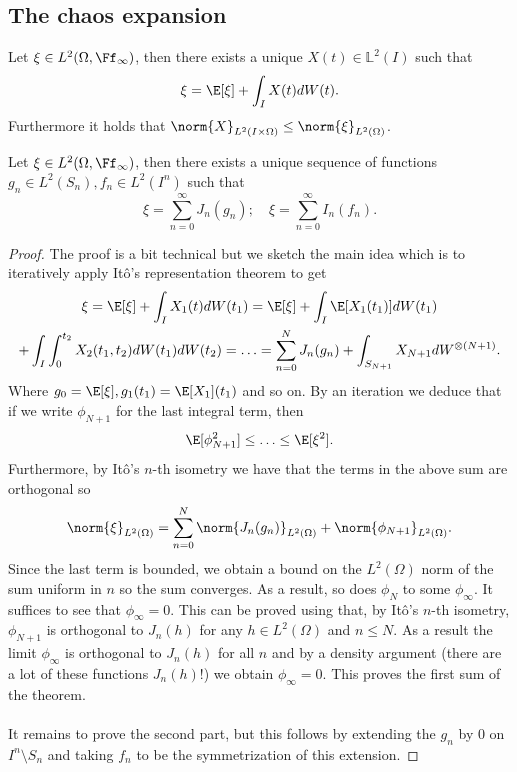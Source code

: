 \documentclass[
    a4paper,
    DIV=14,
    abstract=true,
    numbers=noenddot
]{scrartcl}
\begin{document}
\subsection{The chaos expansion}
\begin{lemma}
	Let $\xi\in L^2(\Omega,\Ff_\infty)$, then there exists a unique $X(t)\in \mathbb{L}^2(I)$ such that
	\begin{equation*}
		\xi=\E[\xi]+\int_{I} X(t)dW(t).
	\end{equation*}
	Furthermore it holds that $\norm{X}_{L^2(I\times\Omega)}\leq \norm{\xi}_{L^2(\Omega)}$.
\end{lemma}


\begin{theorem}\label{chaos thm}
	Let $\xi\in L^2(\Omega,\Ff_\infty)$, then there exists a unique sequence of functions $g_n \in L^2(S_n),f_n \in L^2(I^n)$ such that
	\begin{equation*}
		\xi=\sum_{n=0}^{\infty}  J_n(g_n);\quad \xi=\sum_{n=0}^{\infty} I_n(f_n).
	\end{equation*}
	\begin{proof}
		The proof is a bit technical but we sketch the main idea which is to iteratively apply Itô's representation theorem to get
		\begin{multline*}
			\xi=\E[\xi]+\int_I X_1(t)dW(t_1)=\E[\xi]+\int_{I} \E[X_1(t_1)] dW(t_1)\\+ \int_{I}\int_{0}^{t_2} X_2(t_1,t_2) dW(t_1)dW(t_2)= \ldots=\sum_{n=0}^{N}  J_n(g_n)+ \int_{S_{N+1}} X_{N+1} dW^{\otimes(N+1)}.
		\end{multline*}
		Where $g_0=\E[\xi], g_1(t_1) =\E[X_1](t_1)$ and so on. By an iteration we deduce that if we write $\phi_{N+1}$ for the last integral term, then
		\begin{equation*}
			\E[\phi_{N+1}^2]\leq\ldots\leq \E[\xi^2].
		\end{equation*}
		Furthermore, by Itô's $n$-th isometry we have that the terms in the above sum are orthogonal so
		\begin{equation*}
			\norm{\xi}_{L^2(\Omega)}=\sum_{n=0}^{N} \norm{J_n(g_n)}_{L^2(\Omega)} +\norm{\phi_{N+1}}_{L^2(\Omega)}.
		\end{equation*}
		Since the last term is bounded, we obtain a bound on the $L^2(\Omega)$ norm of the sum uniform in  $n$ so the sum converges. As a result, so does $\phi_N$  to some $\phi_\infty$. It suffices to see that $\phi_\infty=0$. This can be proved using that, by Itô's  $n$-th isometry, $\phi_{N+1}$ is orthogonal to  $J_n(h)$ for any $h\in L^2(\Omega)$ and $n\leq N$. As a result the limit $\phi_\infty$ is orthogonal to $J_n(h)$ for all  $n$  and by a density argument (there are a lot of these functions $J_n(h)$!) we obtain $\phi_\infty=0$. This proves the first sum of the theorem.\\\\
		It remains to prove the second part, but this follows by extending the $g_n$ by  $0$ on  $I^n\setminus S_n$ and taking $f_n$ to be the symmetrization of this extension.
	\end{proof}


\end{theorem}




\end{document}
